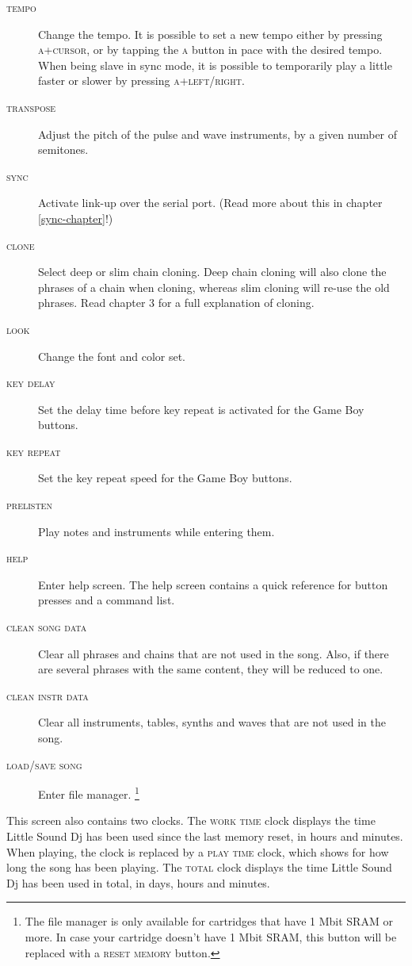 \begin{description}
	\item[\textsc{tempo}] Change the tempo. It is possible to set a new tempo either by pressing
\textsc{a+cursor}, or by tapping the \textsc{a} button in pace with the desired tempo. When being
slave in sync mode, it is possible to temporarily play a little faster or slower by pressing \textsc{a+left/right}.
	\item[\textsc{transpose}] Adjust the pitch of the pulse and wave instruments, by a given number of semitones.
	\item[\textsc{sync}] Activate link-up over the serial port. (Read more about this in chapter \ref{sync-chapter}!)
	\item[\textsc{clone}] Select deep or slim chain cloning. Deep chain cloning will also clone the phrases of a chain when cloning, whereas slim cloning will re-use the old phrases. Read chapter 3 for a full explanation of cloning.
	\item[\textsc{look}] Change the font and color set.
	\item[\textsc{key delay}] Set the delay time before key repeat is activated for the Game Boy buttons.
	\item[\textsc{key repeat}] Set the key repeat speed for the Game Boy buttons.
	\item[\textsc{prelisten}] Play notes and instruments while entering them.
	\item[\textsc{help}] Enter help screen. The help screen contains a quick reference for button presses and a command list.

	\item[\textsc{clean song data}] Clear all phrases and chains that are not used in the song. Also, if there are several phrases with the same content, they will be reduced to one. \label{clean-song-data}
	\item[\textsc{clean instr data}] Clear all instruments, tables, synths and waves that are not used in the song.
	\item[\textsc{load/save song}] Enter file manager. \footnote{The file manager is only available for cartridges that have 1 Mbit SRAM or more. In case your cartridge doesn't have 1 Mbit SRAM, this button will be replaced with a \textsc{reset memory} button.}
\end{description}

This screen also contains two clocks. The \textsc{work time} clock displays the time Little Sound Dj has been used since the last memory reset, in hours and minutes. When playing, the clock
is replaced by a \textsc{play time} clock, which shows for how long the song has been playing. The \textsc{total} clock displays the time Little Sound Dj has been used in total, in days, hours and minutes.

